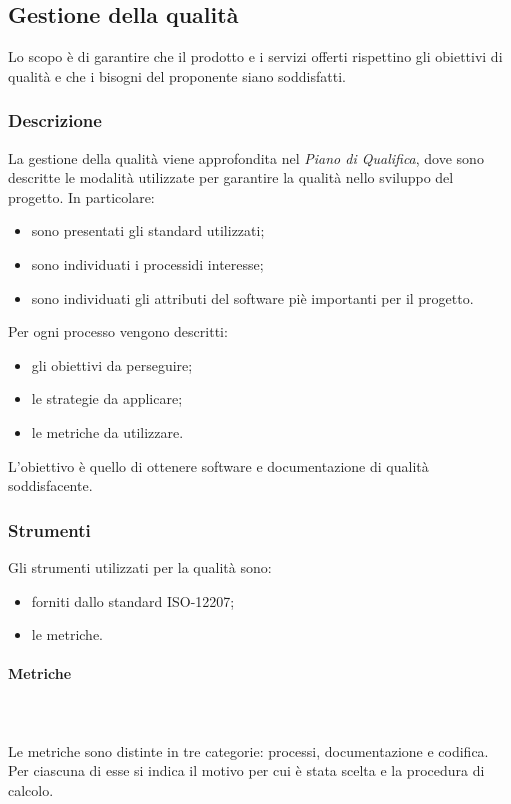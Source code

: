 \subsection{Gestione della qualità}
Lo scopo è di garantire che il prodotto e i servizi offerti rispettino gli obiettivi di qualità e che i bisogni del proponente siano soddisfatti. 

\subsubsection{Descrizione}
La gestione della qualità viene approfondita nel \textit{Piano di Qualifica}, dove sono descritte le modalità utilizzate per garantire la qualità nello sviluppo del progetto. In particolare: \begin{itemize}
\item sono presentati gli standard utilizzati;
\item sono individuati i processi\glo di interesse;
\item sono individuati gli attributi del software piè importanti per il progetto.
\end{itemize}
Per ogni processo vengono descritti: \begin{itemize}
\item gli obiettivi da perseguire;
\item le strategie da applicare;
\item le metriche da utilizzare.
\end{itemize}
L'obiettivo è quello di ottenere software e documentazione di qualità soddisfacente.

\subsubsection{Strumenti}
Gli strumenti utilizzati per la qualità sono:
\begin{itemize}
\item forniti dallo standard ISO-12207;
\item le metriche.
\end{itemize}

\paragraph{Metriche} \mbox{} \\ \mbox{} \\
Le metriche sono distinte in tre categorie: processi, documentazione e codifica. Per ciascuna di esse si indica il motivo per cui è stata scelta e la procedura di calcolo.

